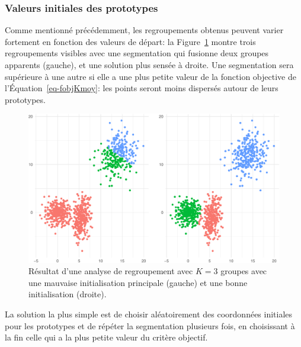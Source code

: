 \documentclass[
  11pt,
  letterpaper,
]{book}
\theoremstyle{definition}
\theoremstyle{remark}
\begin{document}
\hypertarget{valeurs-initiales-des-prototypes}{%
\subsubsection*{Valeurs initiales des
prototypes}\label{valeurs-initiales-des-prototypes}}

Comme mentionné précédemment, les regroupements obtenus peuvent varier
fortement en fonction des valeurs de départ: la
Figure~\ref{fig-kmoyenne-mauvais} montre trois regroupements visibles
avec une segmentation qui fusionne deux groupes apparents (gauche), et
une solution plus sensée à droite. Une segmentation sera supérieure à
une autre si elle a une plus petite valeur de la fonction objective de
l'Équation~\ref{eq-fobjKmoy}: les points seront moins dispersés autour
de leurs prototypes.

\begin{figure}[ht!]

{\centering \includegraphics[width=1\textwidth,height=\textheight]{./03-regroupements_files/figure-pdf/fig-kmoyenne-mauvais-1.pdf}

}

\caption{\label{fig-kmoyenne-mauvais}Résultat d'une analyse de
regroupement avec \(K=3\) groupes avec une mauvaise initialisation
principale (gauche) et une bonne initialisation (droite).}

\end{figure}

La solution la plus simple est de choisir aléatoirement des coordonnées
initiales pour les prototypes et de répéter la segmentation plusieurs
fois, en choisissant à la fin celle qui a la plus petite valeur du
critère objectif.
\end{document}
